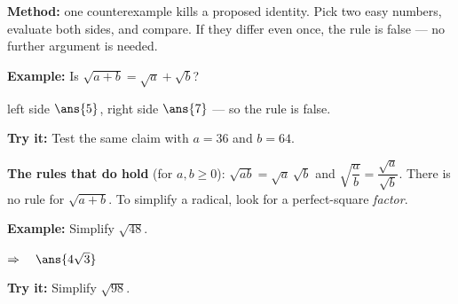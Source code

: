 \documentclass[12pt]{article}
\begin{document}


\begin{formulabox}
\textbf{Method:} one counterexample kills a proposed identity. Pick two easy
numbers, evaluate both sides, and compare. If they differ even once, the rule is
false --- no further argument is needed.
\end{formulabox}

\begin{examplebox}
\textbf{Example:} \quad Is $\sqrt{a+b} = \sqrt{a}+\sqrt{b}$?

left side $\ans{5}$, \quad right side $\ans{7}$ --- so the rule is false.
\end{examplebox}

\begin{tryitbox}
\textbf{Try it:} \quad Test the same claim with $a = 36$ and $b = 64$.\\[2pt]
\end{tryitbox}


\begin{formulabox}
\textbf{The rules that do hold} (for $a, b \ge 0$):
$\sqrt{ab} = \sqrt{a}\,\sqrt{b}$ \quad and \quad
$\sqrt{\dfrac{a}{b}} = \dfrac{\sqrt{a}}{\sqrt{b}}$.
There is no rule for $\sqrt{a+b}$. To simplify a radical, look for a
perfect-square \emph{factor}.
\end{formulabox}

\begin{examplebox}
\textbf{Example:} \quad Simplify $\sqrt{48}$.

$\Rightarrow\quad \ans{4\sqrt{3}}$
\end{examplebox}

\begin{tryitbox}
\textbf{Try it:} \quad Simplify $\sqrt{98}$.\\[2pt]
\end{tryitbox}
\end{document}
